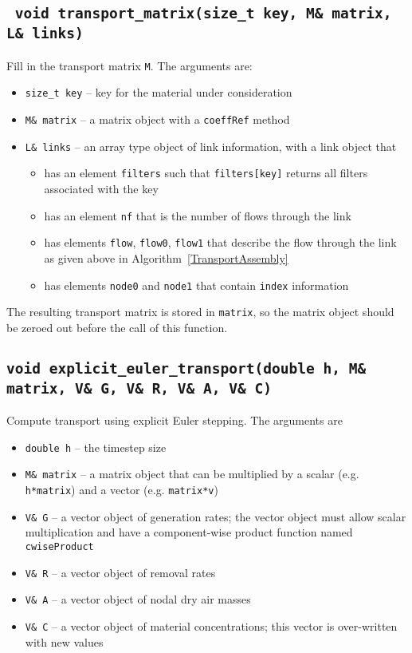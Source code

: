 \documentclass[10pt]{report}
\newcommand{\algoref}[1]{Algorithm~\ref{#1}}
\begin{document}
\subsection{\texttt{ void transport\_matrix(size\_t key, M\& matrix, L\& links)}}
Fill in the transport matrix \texttt{M}. The arguments are:
\begin{itemize}
\item \texttt{size\_t key} -- key for the material under consideration
\item \texttt{M\& matrix} -- a matrix object with a \texttt{coeffRef} method
\item \texttt{L\& links} -- an array type object of link information, with a link object that
\begin{itemize}
\item has an element \texttt{filters} such that \texttt{filters[key]} returns all filters associated with the key
\item has an  element \texttt{nf} that is the number of flows through the link
\item has elements \texttt{flow}, \texttt{flow0}, \texttt{flow1} that describe the flow through the link as given above in \algoref{TransportAssembly}
\item has elements \texttt{node0} and \texttt{node1} that contain \texttt{index} information
\end{itemize}
\end{itemize}
The resulting transport matrix is stored in \texttt{matrix}, so the matrix object should be
zeroed out before the call of this function.
\subsection{\texttt{void explicit\_euler\_transport(double h, M\& matrix, V\& G, V\& R, V\& A, V\& C)}}
Compute transport using explicit Euler stepping. The arguments are
\begin{itemize}
\item \texttt{double h} -- the timestep size
\item \texttt{M\& matrix} -- a matrix object that can be multiplied by a scalar (e.g. \texttt{h*matrix}) and a vector  (e.g. \texttt{matrix*v})
\item \texttt{V\& G} -- a vector object of generation rates; the vector object must allow scalar multiplication and have a component-wise product function named \texttt{cwiseProduct}
\item \texttt{V\& R} -- a vector object of removal rates
\item \texttt{V\& A} -- a vector object of nodal dry air masses
\item \texttt{V\& C} -- a vector object of material concentrations; this vector is over-written with new values
\end{itemize}
\end{document}
